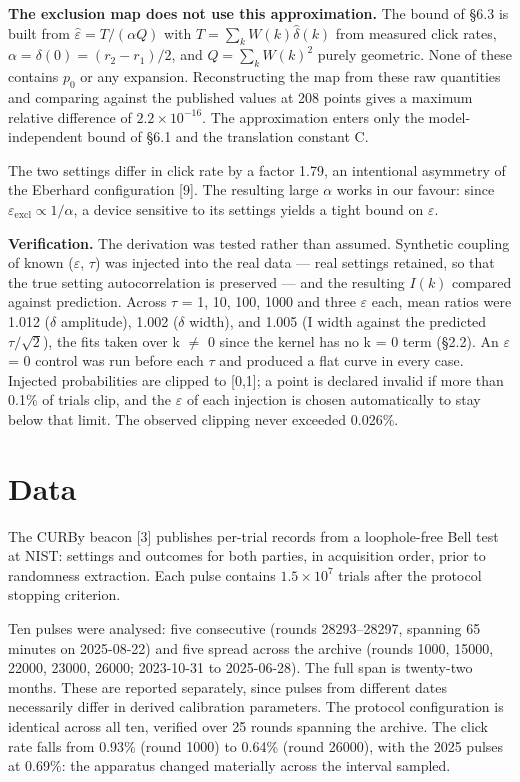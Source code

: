 \documentclass[
  11pt,
]{article}
\begin{document}
\textbf{The exclusion map does not use this approximation.} The bound of
\S6.3 is built from \(\hat\varepsilon=T/(\alpha Q)\) with
\(T=\sum_k W(k)\hat\delta(k)\) from measured click rates,
\(\alpha=\delta(0)=(r_2-r_1)/2\), and \(Q=\sum_k W(k)^2\) purely
geometric. None of these contains \(p_{0}\) or any expansion.
Reconstructing the map from these raw quantities and comparing against
the published values at 208 points gives a maximum relative difference
of \(2.2 \times 10^{-16}\). The approximation enters only the
model-independent bound of \S6.1 and the translation constant C.

The two settings differ in click rate by a factor 1.79, an intentional
asymmetry of the Eberhard configuration {[}9{]}. The resulting large
\(\alpha\) works in our favour: since
\(\varepsilon_{\mathrm{excl}} \propto 1/\alpha\), a device sensitive to
its settings yields a tight bound on \(\varepsilon\).

\textbf{Verification.} The derivation was tested rather than assumed.
Synthetic coupling of known (\(\varepsilon\), \(\tau\)) was injected
into the real data --- real settings retained, so that the true setting
autocorrelation is preserved --- and the resulting \(I(k)\) compared
against prediction. Across \(\tau\) = 1, 10, 100, 1000 and three
\(\varepsilon\) each, mean ratios were 1.012 (\(\delta\) amplitude),
1.002 (\(\delta\) width), and 1.005 (I width against the predicted
\(\tau/\sqrt2\)), the fits taken over k \(\ne\) 0 since the kernel has
no k = 0 term (\S2.2). An \(\varepsilon\) = 0 control was run before
each \(\tau\) and produced a flat curve in every case. Injected
probabilities are clipped to {[}0,1{]}; a point is declared invalid if
more than 0.1\% of trials clip, and the \(\varepsilon\) of each
injection is chosen automatically to stay below that limit. The observed
clipping never exceeded 0.026\%.

\section{Data}

The CURBy beacon {[}3{]} publishes per-trial records from a
loophole-free Bell test at NIST: settings and outcomes for both parties,
in acquisition order, prior to randomness extraction. Each pulse
contains \(1.5 \times 10^{7}\) trials after the protocol stopping
criterion.

Ten pulses were analysed: five consecutive (rounds 28293--28297,
spanning 65 minutes on 2025-08-22) and five spread across the archive
(rounds 1000, 15000, 22000, 23000, 26000; 2023-10-31 to 2025-06-28). The
full span is twenty-two months. These are reported separately, since
pulses from different dates necessarily differ in derived calibration
parameters. The protocol configuration is identical across all ten,
verified over 25 rounds spanning the archive. The click rate falls from
0.93\% (round 1000) to 0.64\% (round 26000), with the 2025 pulses at
0.69\%: the apparatus changed materially across the interval sampled.
\end{document}
